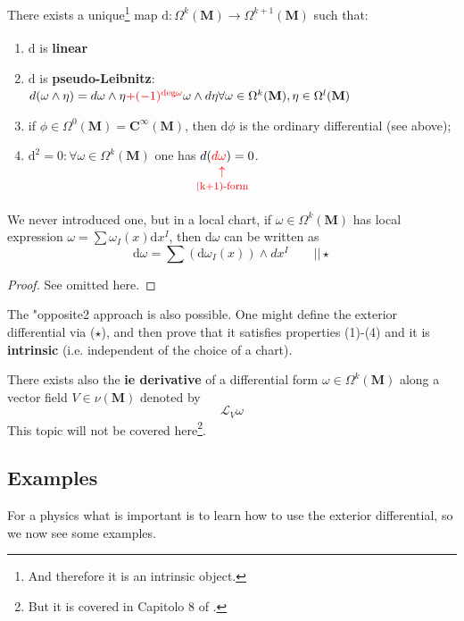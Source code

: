 \documentclass[../main.tex]{subfiles}
\begin{document}
\begin{theorem}[E. Cartan]
There exists a unique\footnote{And therefore it is an intrinsic object.} map $\textrm{d}:\Omega^k(\mathbf{M})\xrightarrow[]{}\Omega^{k+1}(\mathbf{M})$ such that:
\begin{enumerate}
    \item $\textrm{d}$ is \textbf{linear}
    \item $\textrm{d}$ is \textbf{pseudo-Leibnitz}: $d(\omega\wedge\eta)=d\omega\wedge\eta{\color{red}+(-1)^{\text{\textrm{deg}}\omega}}\omega\wedge d\eta\\ \forall\omega\in\Omega^k(\mathbf{M}),\eta\in\Omega^l(\mathbf{M})$
    \item if $\phi\in\Omega^0(\mathbf{M})=\mathbf{C^{\infty}(\mathbf{M})}$, then $\textrm{d}\phi$ is the ordinary differential (see above);
    \item $\textrm{d}^2=0:\forall\omega\in\Omega^k(\mathbf{M})$ one has $d({\color{red}d\underset{\mathclap{\tikz \node {$\uparrow$} node [below=1ex] {\footnotesize (k+1)-form };}}\omega})=0$.
\end{enumerate}
\end{theorem}
We never introduced one, but in a local chart, if $\omega\in\Omega^k(\mathbf{M})$ has local expression $\omega=\sum\omega_I(x)\textrm{d}x^I$,  then $\textrm{d}\omega$ can be written as
\[
\textrm{d}\omega=\sum(\textrm{d}\omega_I(x))\wedge dx^I \qquad \Big|\Big| \star
\]
\begin{proof}
See  omitted here.
\end{proof}
\begin{kaobox}[frametitle=Remark]
The "opposite2 approach is also possible. One might define the exterior differential via ($\star$), and then prove that it satisfies properties (1)-(4) and it is \textbf{intrinsic} (i.e. independent of the choice of a chart).
\end{kaobox}
\begin{kaobox}[frametitle=Remark]
There exists also the \textbf{ie derivative} of a differential form $\omega\in\Omega^k(\mathbf{M})$ along a vector field $V\in\nu(\mathbf{M})$ denoted by
\[
\mathcal{L}_V\omega
\]
This topic will not be covered here\footnote{But it is covered in Capitolo 8 of \cite{ferrari2020general}.}.
\end{kaobox}
\subsection{Examples}
For a physics what is important is to learn how to use the exterior differential, so we now see some examples.\\
\end{document}
